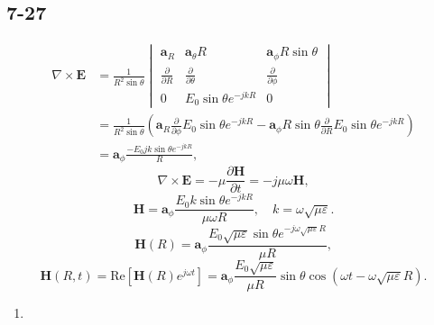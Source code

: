 \documentclass[11pt,a4paper]{article}
\begin{document}
\subsection{7-27}
\begin{align*}
\nabla\times\mathbf{E}&=\frac{1}{R^2\sin\theta}\begin{vmatrix}
\mathbf{a}_R & \mathbf{a}_\theta R & \mathbf{a}_\phi R\sin\theta \\
\frac{\partial}{\partial R} & \frac{\partial}{\partial\theta} & \frac{\partial}{\partial\phi} \\
0 & E_0\sin\theta e^{-jkR} & 0 \end{vmatrix}\\
&=\frac{1}{R^2\sin\theta}\left(\mathbf{a}_R\frac{\partial}{\partial\phi}E_0\sin\theta e^{-jkR}-\mathbf{a}_\phi R\sin\theta\frac{\partial}{\partial R}E_0\sin\theta e^{-jkR}\right)\\
&=\mathbf{a}_\phi\frac{-E_0jk\sin\theta e^{-jkR}}{R},
\end{align*}
$$\nabla\times\mathbf{E} = -\mu\frac{\partial\mathbf{H}}{\partial t}=-j\mu\omega\mathbf{H},$$
$$\mathbf{H}=\mathbf{a}_\phi\frac{E_0k\sin\theta e^{-jkR}}{\mu\omega R},\quad k=\omega\sqrt{\mu\varepsilon}.$$
$$\mathbf{H}(R)=\mathbf{a}_\phi\frac{E_0\sqrt{\mu\varepsilon}\sin\theta e^{-j\omega\sqrt{\mu\varepsilon}R}}{\mu R},$$
$$\mathbf{H}(R,t)=\text{Re}[\mathbf{H}(R)e^{j\omega t}]=\mathbf{a}_\phi\frac{E_0\sqrt{\mu\varepsilon}}{\mu R}\sin\theta\cos(\omega t-\omega\sqrt{\mu\varepsilon}R).$$
\begin{enumerate}[label=\alph*)]
\item

\end{enumerate}
\end{document}
